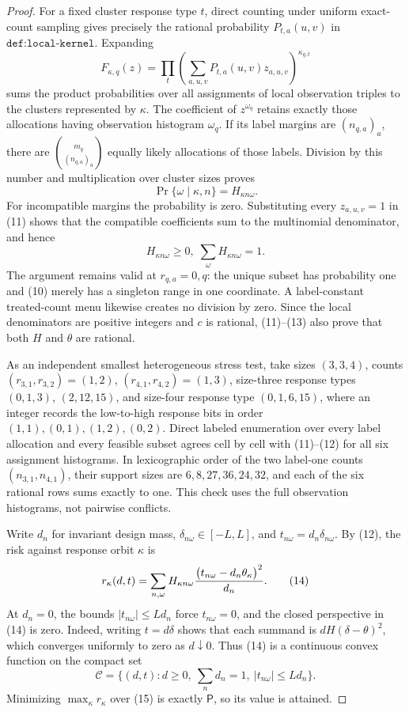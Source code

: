 \documentclass{article}
\begin{document}
\begin{proof}
For a fixed cluster response type \(t\), direct counting under uniform exact-count sampling gives precisely the rational probability \(P_{t,a}(u,v)\) in \(\texttt{def:local-kernel}\).  Expanding
\[
 F_{\kappa,q}(z)=\prod_t
 \left(\sum_{a,u,v}P_{t,a}(u,v)z_{a,u,v}\right)^{\kappa_{q,t}}             \tag{11}
\]
sums the product probabilities over all assignments of local observation triples to the clusters represented by \(\kappa\).  The coefficient of \(z^{\omega_q}\) retains exactly those allocations having observation histogram \(\omega_q\).  If its label margins are \((n_{q,a})_a\), there are
\(
 \binom{m_q}{(n_{q,a})_a}
\)
equally likely allocations of those labels.  Division by this number and multiplication over cluster sizes proves
\[
 \Pr\{\omega\mid\kappa,n\}=H_{\kappa n\omega}.                            \tag{12}
\]
For incompatible margins the probability is zero.  Substituting every \(z_{a,u,v}=1\) in (11) shows that the compatible coefficients sum to the multinomial denominator, and hence
\[
 H_{\kappa n\omega}\ge0,\; \sum_{\omega}H_{\kappa n\omega}=1.           \tag{13}
\]
The argument remains valid at \(r_{q,a}=0,q\): the unique subset has probability one and (10) merely has a singleton range in one coordinate.  A label-constant treated-count menu likewise creates no division by zero.  Since the local denominators are positive integers and \(c\) is rational, (11)--(13) also prove that both \(H\) and \(\theta\) are rational.

As an independent smallest heterogeneous stress test, take sizes \((3,3,4)\), counts \((r_{3,1},r_{3,2})=(1,2)\), \((r_{4,1},r_{4,2})=(1,3)\), size-three response types \((0,1,3)\), \((2,12,15)\), and size-four response type \((0,1,6,15)\), where an integer records the low-to-high response bits in order \((1,1),(0,1),(1,2),(0,2)\).  Direct labeled enumeration over every label allocation and every feasible subset agrees cell by cell with (11)--(12) for all six assignment histograms.  In lexicographic order of the two label-one counts \((n_{3,1},n_{4,1})\), their support sizes are \(6,8,27,36,24,32\), and each of the six rational rows sums exactly to one.  This check uses the full observation histograms, not pairwise conflicts.

Write \(d_n\) for invariant design mass, \(\delta_{n\omega}\in[-L,L]\), and \(t_{n\omega}=d_n\delta_{n\omega}\).  By (12), the risk against response orbit \(\kappa\) is
\[
 r_\kappa(d,t)=\sum_{n,\omega}H_{\kappa n\omega}
       {\bigl(t_{n\omega}-d_n\theta_\kappa\bigr)^2\over d_n}.             \tag{14}
\]
At \(d_n=0\), the bounds \(|t_{n\omega}|\le Ld_n\) force \(t_{n\omega}=0\), and the closed perspective in (14) is zero.  Indeed, writing \(t=d\delta\) shows that each summand is \(dH(\delta-\theta)^2\), which converges uniformly to zero as \(d\downarrow0\).  Thus (14) is a continuous convex function on the compact set
\[
 \mathcal C=\{(d,t):d\ge0,\ \sum_nd_n=1,\ |t_{n\omega}|\le Ld_n\}.         \tag{15}
\]
Minimizing \(\max_\kappa r_\kappa\) over (15) is exactly \(\mathsf P\), so its value is attained.


\end{proof}
\end{document}
